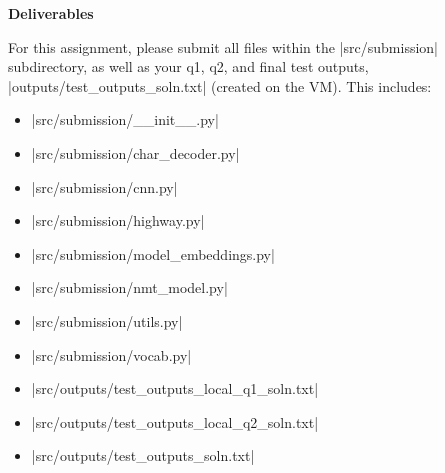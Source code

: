 \textbf{Deliverables}

For this assignment, please submit all files within the |src/submission| subdirectory, as well as your q1, q2, and final test outputs, |outputs/test_outputs_soln.txt| (created on the VM).  This includes:
\begin{itemize}
    \item |src/submission/__init__.py|
    \item |src/submission/char_decoder.py|
    \item |src/submission/cnn.py|
    \item |src/submission/highway.py|
    \item |src/submission/model_embeddings.py|
    \item |src/submission/nmt_model.py|
    \item |src/submission/utils.py|
    \item |src/submission/vocab.py|
    \item |src/outputs/test_outputs_local_q1_soln.txt|
    \item |src/outputs/test_outputs_local_q2_soln.txt|
    \item |src/outputs/test_outputs_soln.txt|
\end{itemize}   
